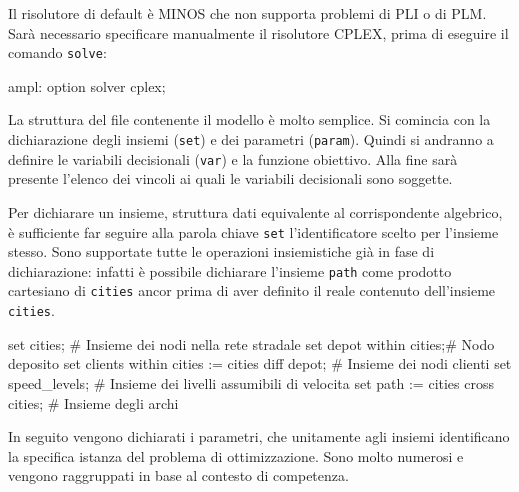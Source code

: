 		Il risolutore di default è MINOS che non supporta problemi di PLI o di PLM. Sarà necessario specificare manualmente il risolutore CPLEX, prima di eseguire il comando \texttt{solve}:

		\begin{amplcode}
			ampl: option solver cplex;
		\end{amplcode}

		La struttura del file contenente il modello è molto semplice. 
		Si comincia con la dichiarazione degli insiemi (\texttt{set}) e dei parametri (\texttt{param}). Quindi si andranno a definire le variabili decisionali (\texttt{var}) e la funzione obiettivo. Alla fine sarà presente l’elenco dei vincoli ai quali le variabili decisionali sono soggette.

		Per dichiarare un insieme, struttura dati equivalente al corrispondente algebrico,  è sufficiente far seguire alla parola chiave \texttt{set} l’identificatore scelto per l’insieme stesso. Sono supportate tutte le operazioni insiemistiche già in fase di dichiarazione: infatti è possibile dichiarare l’insieme \texttt{path} come prodotto cartesiano di \texttt{cities} ancor prima di aver definito il reale contenuto dell’insieme \texttt{cities}.

		\begin{amplcode}
			set cities;				# Insieme dei nodi nella rete stradale
			set depot within cities;# Nodo deposito
			set clients within cities := cities diff depot;	
									# Insieme dei nodi clienti
			set speed_levels;		# Insieme dei livelli assumibili di velocita
			set path := cities cross cities;	
									# Insieme degli archi			
		\end{amplcode}

		In seguito vengono dichiarati i parametri, che unitamente agli insiemi identificano la specifica istanza del problema di ottimizzazione. Sono molto numerosi e vengono raggruppati in base al contesto di competenza.

